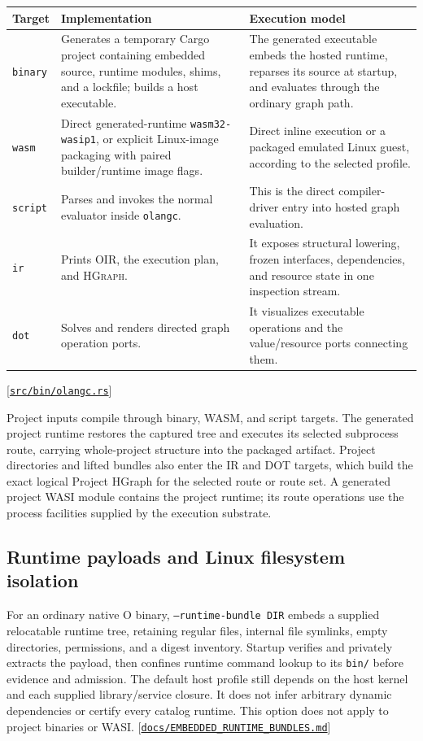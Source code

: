\documentclass[11pt,oneside]{article}
\newcommand{\oir}{{\mdseries\textsc{OIR}}}
\newcommand{\hgraph}{{\mdseries\textsc{HGraph}}}
\newcommand{\src}[1]{\textcolor{OSlate}{\scriptsize[\href{https://github.com/lostadi/OSTADIX/blob/c0b02c326b2329a95ba52447c7180bc93957cd57/#1}{\nolinkurl{#1}}]}\allowbreak}
\begin{document}
\begin{longtable}{P{0.16\textwidth} P{0.47\textwidth} P{0.29\textwidth}}
\toprule
\textbf{Target} & \textbf{Implementation} & \textbf{Execution model} \\
\midrule
\endhead
\texttt{binary} &
Generates a temporary Cargo project containing embedded source, runtime
modules, shims, and a lockfile; builds a host executable. &
The generated executable embeds the hosted runtime, reparses its source at
startup, and evaluates through the ordinary graph path. \\
\texttt{wasm} &
Direct generated-runtime \texttt{wasm32-wasip1}, or explicit Linux-image
packaging with paired builder/runtime image flags. &
Direct inline execution or a packaged emulated Linux guest, according to
the selected profile. \\
\texttt{script} &
Parses and invokes the normal evaluator inside \texttt{olangc}. &
This is the direct compiler-driver entry into hosted graph evaluation. \\
\texttt{ir} &
Prints \oir{}, the execution plan, and \hgraph{}. &
It exposes structural lowering, frozen interfaces, dependencies, and resource
state in one inspection stream. \\
\texttt{dot} &
Solves and renders directed graph operation ports. &
It visualizes executable operations and the value/resource ports connecting
them. \\
\bottomrule
\end{longtable}

\src{src/bin/olangc.rs}

Project inputs compile through binary, WASM, and script targets. The generated
project runtime restores the captured tree and executes its selected
subprocess route, carrying whole-project structure into the packaged artifact.
Project directories and lifted bundles also enter the IR and DOT targets,
which build the exact logical Project HGraph for the selected route or route
set. A generated project WASI module contains the project runtime; its route
operations use the process facilities supplied by the execution substrate.

\subsection{Runtime payloads and Linux filesystem isolation}

For an ordinary native O binary, \texttt{--runtime-bundle DIR} embeds a
supplied relocatable runtime tree, retaining regular files, internal file
symlinks, empty directories, permissions, and a digest inventory. Startup
verifies and privately extracts the payload, then confines runtime command
lookup to its \texttt{bin/} before evidence and admission. The default host
profile still depends on the host kernel and each supplied library/service
closure. It does not infer arbitrary dynamic dependencies or certify every
catalog runtime. This option does not apply to project binaries or WASI.
\src{docs/EMBEDDED_RUNTIME_BUNDLES.md}
\end{document}
